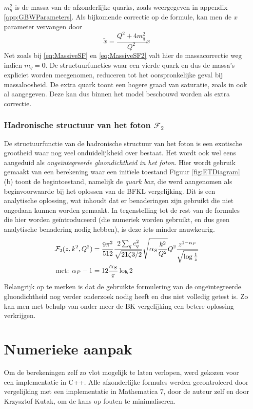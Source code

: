 \documentclass[a4paper,11pt]{article}
\numberwithin{equation}{section} %
\begin{document}
$m_q^2$ is de massa van de afzonderlijke quarks, zoals weergegeven in appendix \ref{app:GBWParameters}.
Als bijkomende correctie op de formule, kan men de $x$ parameter vervangen door
\begin{equation}
\tilde{x} = \frac{Q^2+ 4 m_q^2}{Q^2} x 
\end{equation}
Net zoals bij \eqref{eq:MassiveSF} en \eqref{eq:MassiveSF2} valt hier de massacorrectie weg indien $m_q=0$.
De structuurfuncties waar een vierde quark en dus de massa’s expliciet worden meegenomen, reduceren tot het oorspronkelijke geval bij massaloosheid.
De extra quark toont een hogere graad van saturatie, zoals in \cite{GBW} ook al aangegeven.
Deze kan dus binnen het model beschouwd worden als extra correctie.

    \subsubsection{Hadronische structuur van het foton $\mathcal{F}_2$} \label{sec:UGDPhoton}
De structuurfunctie van de hadronische structuur van het foton is een exotische grootheid waar nog veel onduidelijkheid over bestaat.
Het wordt ook wel eens aangeduid als \textit{ongeïntegreerde gluondichtheid in het foton}.
Hier wordt gebruik gemaakt van een berekening waar een initïele toestand
Figuur \ref{fig:ETDiagram} (b) toont de begintoestand, namelijk de \textit{quark box}, die werd aangenomen als beginvoorwaarde bij het oplossen van de BFKL vergelijking.
Dit is een analytische oplossing, wat inhoudt dat er benaderingen zijn gebruikt die niet ongedaan kunnen worden gemaakt.
In tegenstelling tot de rest van de formules die hier worden geïntroduceerd (die numeriek worden gebruikt, en dus geen analytische benadering nodig hebben), is deze iets minder nauwkeurig.
\begin{align} \label{eq:UGDPhoton}
\mathcal{F}_2(z,k^2,Q^2) &= \frac{9\pi^2}{512} \frac{2\sum_q e_q^2}{\sqrt{21\zeta{3}/2}} \sqrt{\alpha_S \frac{k^2}{Q^2}} Q^2 \frac{z^{1-\alpha_P}}{\sqrt{\log{\frac{1}{z}}}} \\
\text{met: } \alpha_P -1 &=  12  \frac{\alpha_S}{\pi} \log{2} \notag
\end{align}
Belangrijk op te merken is dat de gebruikte formulering van de ongeïntegreerde gluondichtheid nog verder onderzoek nodig heeft en dus niet volledig getest is.
Zo kan men met behulp van onder meer de BK vergelijking een betere oplossing verkrijgen.

\section{Numerieke aanpak}
Om de berekeningen zelf zo vlot mogelijk te laten verlopen, werd gekozen voor een implementatie in C++.
Alle afzonderlijke formules werden gecontroleerd door vergelijking met een implementatie in Mathematica 7, door de auteur zelf en door Krzysztof Kutak, om de kans op fouten te minimaliseren.
\end{document}
